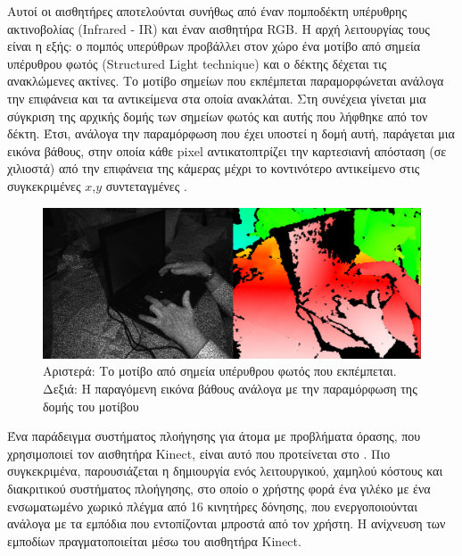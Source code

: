 Αυτοί οι αισθητήρες αποτελούνται συνήθως από έναν πομποδέκτη υπέρυθρης ακτινοβολίας (Infrared - IR) και έναν αισθητήρα RGB. Η αρχή λειτουργίας τους είναι η εξής: ο πομπός υπερύθρων προβάλλει στον χώρο ένα μοτίβο από σημεία υπέρυθρου φωτός (Structured Light technique) και ο δέκτης δέχεται τις ανακλώμενες ακτίνες. Το μοτίβο σημείων που εκπέμπεται παραμορφώνεται ανάλογα την επιφάνεια και τα αντικείμενα στα οποία ανακλάται. Στη συνέχεια γίνεται μια σύγκριση της αρχικής δομής των σημείων φωτός και αυτής που λήφθηκε από τον δέκτη. Έτσι, ανάλογα την παραμόρφωση που έχει υποστεί η δομή αυτή, παράγεται μια εικόνα βάθους, στην οποία κάθε pixel αντικατοπτρίζει την καρτεσιανή απόσταση (σε χιλιοστά) από την επιφάνεια της κάμερας μέχρι το κοντινότερο αντικείμενο στις συγκεκριμένες $x$,$y$ συντεταγμένες \cite{wiki:kinect}.
\begin{figure}[H]
    \centering
    \includegraphics[width=\textwidth]{images/ir_structured_light.jpg}
    \caption{Αριστερά: Το μοτίβο από σημεία υπέρυθρου φωτός που εκπέμπεται. Δεξιά: Η παραγόμενη εικόνα βάθους ανάλογα με την παραμόρφωση της δομής του μοτίβου}
    \label{fig:structured-light}
\end{figure}
\hspace{1cm}

Ένα παράδειγμα συστήματος πλοήγησης για άτομα με προβλήματα όρασης, που χρησιμοποιεί τον αισθητήρα Kinect, είναι αυτό που προτείνεται στο \cite{kalaba2017}. Πιο συγκεκριμένα, παρουσιάζεται η δημιουργία ενός λειτουργικού, χαμηλού κόστους και διακριτικού συστήματος πλοήγησης, στο οποίο ο χρήστης φορά ένα γιλέκο με ένα ενσωματωμένο χωρικό πλέγμα από 16 κινητήρες δόνησης, που ενεργοποιούνται ανάλογα με τα εμπόδια που εντοπίζονται μπροστά από τον χρήστη. Η ανίχνευση των εμποδίων πραγματοποιείται μέσω του αισθητήρα Kinect.